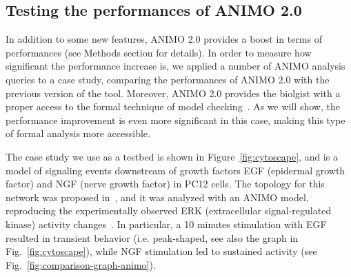 \documentclass{bmcart}
\begin{document}
\subsection*{Testing the performances of ANIMO 2.0}\label{subsec:model-checking}
In addition to some new features, ANIMO 2.0 provides a boost in terms of performances
(see Methods section for details).
In order to measure how significant the performance increase is, we applied a number of
ANIMO analysis queries to a case study, comparing the performances of ANIMO 2.0 with
the previous version of the tool. Moreover, ANIMO 2.0 provides the biolgist with
a proper access to the formal technique of model checking~\cite{model-checking}. As we will show, the
performance improvement is even more significant in this case, making this type of formal
analysis more accessible.

The case study we use as a testbed is shown in Figure~\ref{fig:cytoscape},
and is a model of signaling events downstream of growth factors EGF (epidermal growth factor)
and NGF (nerve growth factor) in PC12 cells.
The topology for this network was proposed in~\cite{egf-ngf}, and it was analyzed
with an ANIMO model, reproducing the experimentally 
observed ERK (extracellular signal-regulated kinase) activity changes~\cite{animo-bibe}.
In particular, a 10 minutes stimulation with EGF resulted in transient behavior (i.e. peak-shaped,
see also the graph in Fig.~\ref{fig:cytoscape}), while NGF stimulation led to sustained activity (see Fig.~\ref{fig:comparison-graph-animo}).
\end{document}
